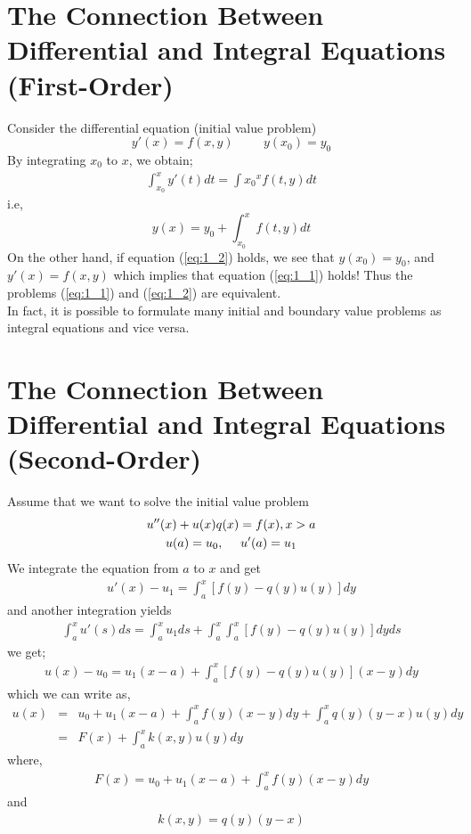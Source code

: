 \documentclass[11pt]{report}
\newcommand{\sps}{\\[0.2cm]}
\newcommand{\refn}[1]{(\ref{#1})}
\newcommand{\refx}[1]{\refn{eq:#1}}
\newcommand{\NI}{\noindent}
\begin{document}
	\section{The Connection Between Differential and Integral Equations (First-Order)}
	Consider the differential equation (initial value problem)
	\begin{equation}
		y'(x) = f(x,y)\hspace{1cm} y(x_0) = y_0\label{eq:1_1}
	\end{equation}
	By integrating $x_0$ to  $x$, we obtain;
	\begin{eqnarray*}
		\int_{x_0}^{x} y'(t)dt = \int{x_0}^{x} f(t,y)dt
	\end{eqnarray*}
	i.e,
	\begin{equation}
		y(x) = y_0 + \int_{x_0}^{x} f(t,y)dt\label{eq:1_2}
	\end{equation}
	On the other hand, if equation \refx{1_2} holds, we see that $y(x_0) = y_0$, and $y'(x) = f(x,y)$ which implies that equation \refx{1_1} holds! Thus the problems \refx{1_1} and \refx{1_2} are equivalent.\\
	
	\NI In fact, it is possible to formulate many initial and boundary value problems as integral equations and vice versa.
	
	\section{The Connection Between Differential and Integral Equations (Second-Order)}
	Assume that we want to solve the initial value problem
	\begin{gather}
		u''(x) + u(x)q(x) = f(x), x>a\\
		u(a) = u_0,~~~~ u'(a) = u_1\notag
	\end{gather}
	We integrate the equation from $a$ to $x$ and get
	\begin{eqnarray*}
		u'(x) - u_1 = \int_{a}^{x} [f(y) - q(y)u(y)]dy\label{eq:1_3}
	\end{eqnarray*}
	and another integration yields
	\begin{eqnarray*}
		\int_{a}^{x} u'(s)ds = \int_{a}^{x} u_1ds + \int_{a}^{x}\int_{a}^{x} [f(y) - q(y)u(y)]dyds
	\end{eqnarray*}
	we get;
	\begin{eqnarray*}
		u(x) - u_0 = u_1(x-a) + \int_{a}^{x} [f(y) - q(y)u(y)](x - y)dy
	\end{eqnarray*}
	which we can write as,
	\begin{eqnarray*}
		u(x) &=& u_0 + u_1(x-a) + \int_{a}^{x} f(y)(x - y)dy + \int_{a}^{x} q(y)(y - x)u(y)dy\sps
		&=& F(x) + \int_{a}^{x} k(x,y)u(y)dy
	\end{eqnarray*}
	where,
	\begin{eqnarray*}
		F(x) = u_0 + u_1(x - a) + \int_{a}^{x} f(y)(x - y)dy
	\end{eqnarray*}
	and
	\begin{eqnarray*}
			k(x,y) = q(y)(y - x)
	\end{eqnarray*}
	
\end{document}
